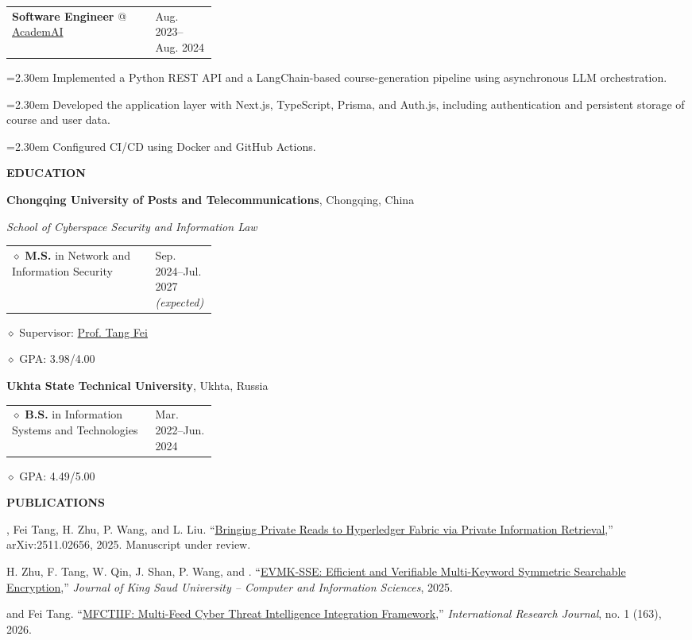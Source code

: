 \documentclass[11pt,a4paper]{article}
\makeatletter
\newcommand{\cvrow}[2]{%
  \noindent
  \begin{minipage}[t]{0.145\textwidth}
    \vspace{0pt}%
    \raggedright
    \fontsize{8.5}{10}\selectfont
    \bfseries\MakeUppercase{#1}
  \end{minipage}%
  \hfill
  \begin{minipage}[t]{0.835\textwidth}
    \vspace{0pt}%
    #2
  \end{minipage}\par
}
\newcommand{\pub}[2]{%
  #1 #2\par
  \vspace{0.28em}
}
\newcommand{\eduentry}[2]{%
  \noindent
  \begin{tabularx}{\linewidth}
    {@{}X@{\hspace{0.8em}}
    >{\raggedleft\arraybackslash}p{0.30\linewidth}@{}}
    #1 & \small #2
  \end{tabularx}\par
  \vspace{0.15em}
}
\newcommand{\edudetail}[1]{%
  \noindent\hspace*{1.15em}$\diamond$ #1\par
}
\newcommand{\workentry}[2]{%
  \noindent
  \begin{tabularx}{\linewidth}
    {@{}X@{\hspace{0.8em}}
    >{\raggedleft\arraybackslash}p{0.30\linewidth}@{}}
    #1 & \small #2
  \end{tabularx}\par
  \vspace{0.15em}
}
\newcommand{\workproject}[1]{%
  \noindent
  \hangindent=2.30em
  \hangafter=1
  \hspace*{1.15em}\makebox[1.15em][l]{$\diamond$}#1\par
  \vspace{0.12em}
}
\makeatother
\begin{document}
\vspace{0.50em}

\cvrow{}{%
  \workentry
    {\textbf{Software Engineer} @ \href{https://academai.ru/}{AcademAI}}
    {Aug. 2023--Aug. 2024}

  \workproject{Implemented a Python REST API and a LangChain-based course-generation
  pipeline using asynchronous LLM orchestration.}
  \workproject{Developed the application layer with Next.js, TypeScript, Prisma,
  and Auth.js, including authentication and persistent storage of course and user data.}
  \workproject{Configured CI/CD using Docker and GitHub Actions.}
}

\vspace{0.75em}

\cvrow{Education}{%
  \raggedright

  \textbf{Chongqing University of Posts and Telecommunications},
  Chongqing, China\par
  \textit{School of Cyberspace Security and Information Law}\par
  \vspace{0.12em}

  \eduentry
    {$\diamond$ \textbf{M.S.} in Network and Information Security}
    {Sep. 2024--Jul. 2027 \textit{(expected)}}

  \edudetail{Supervisor:
    \href{https://faculty.cqupt.edu.cn/tangfei/en/index.htm}{Prof. Tang Fei}}
  \edudetail{GPA: 3.98/4.00}

  \vspace{0.48em}

  \textbf{Ukhta State Technical University}, Ukhta, Russia\par
  \vspace{0.12em}

  \eduentry
    {$\diamond$ \textbf{B.S.} in Information Systems and Technologies}
    {Mar. 2022--Jun. 2024}

  \edudetail{GPA: 4.49/5.00}
}

\vspace{0.75em}

\cvrow{Publications}{%
  \pub{, Fei Tang, H. Zhu, P. Wang, and L. Liu.}
  {``\href{https://arxiv.org/abs/2511.02656}
  {Bringing Private Reads to Hyperledger Fabric via Private Information Retrieval},''
  arXiv:2511.02656, 2025. Manuscript under review.}

  \pub{H. Zhu, F. Tang, W. Qin, J. Shan, P. Wang, and \underbar{Artur Iasenovets}.}
  {``\href{https://doi.org/10.1007/s44443-025-00405-8}
  {EVMK-SSE: Efficient and Verifiable Multi-Keyword Symmetric Searchable Encryption},''
  \textit{Journal of King Saud University -- Computer and Information Sciences}, 2025.}

  \pub{\underbar{Artur Iasenovets} and Fei Tang.}
  {``\href{https://doi.org/10.60797/IRJ.2026.163.57}
  {MFCTIIF: Multi-Feed Cyber Threat Intelligence Integration Framework},''
  \textit{International Research Journal}, no. 1 (163), 2026.}
}
\end{document}

